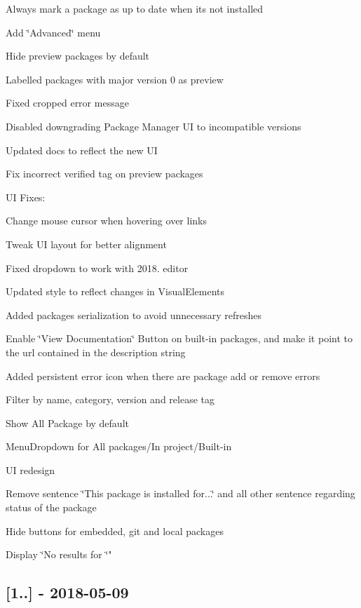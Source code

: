 \begin{DoxyItemize}
\item Always mark a package as up to date when it\textquotesingle{}s not installed
\item Add \char`\"{}\+Advanced\char`\"{} menu
\item Hide preview packages by default
\item Labelled packages with major version \textquotesingle{}0\textquotesingle{} as preview
\item Fixed cropped error message
\item Disabled downgrading Package Manager UI to incompatible versions
\item Updated docs to reflect the new UI
\item Fix incorrect verified tag on preview packages
\item UI Fixes\+:
\begin{DoxyItemize}
\item Change mouse cursor when hovering over links
\item Tweak UI layout for better alignment
\end{DoxyItemize}
\item Fixed dropdown to work with 2018. editor
\item Updated style to reflect changes in Visual\+Elements
\item Added packages serialization to avoid unnecessary refreshes
\item Enable \char`\"{}\+View Documentation\char`\"{} Button on built-\/in packages, and make it point to the url contained in the description string
\item Added persistent error icon when there are package add or remove errors
\item Filter by name, category, version and release tag
\item Show All Package by default
\item Menu\+Dropdown for All packages/\+In project/\+Built-\/in
\item UI redesign
\item Remove sentence \char`\"{}\+This package is installed for...\char`\"{} and all other sentence regarding status of the package
\item Hide buttons for embedded, git and local packages
\item Display \char`\"{}\+No results for \char`\"{}"
\end{DoxyItemize}

\subsection*{\mbox{[}1..\mbox{]} -\/ 2018-\/05-\/09}


